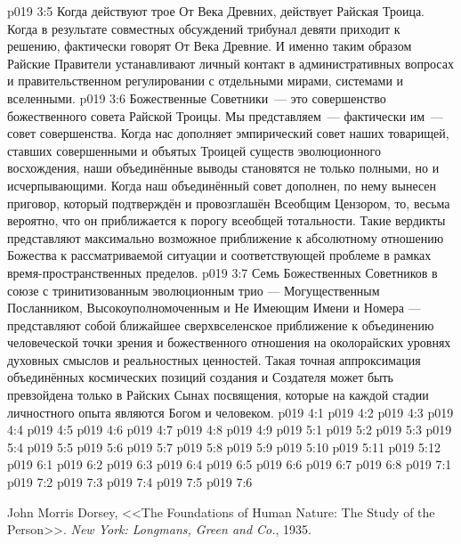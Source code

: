 \vs p019 3:5 Когда действуют трое От Века Древних, действует Райская Троица. Когда в результате совместных обсуждений трибунал девяти приходит к решению, фактически говорят От Века Древние. И именно таким образом Райские Правители устанавливают личный контакт в административных вопросах и правительственном регулировании с отдельными мирами, системами и вселенными.
\vs p019 3:6 \pc Божественные Советники~--- это совершенство божественного совета Райской Троицы. Мы представляем~--- фактически  им~--- совет совершенства. Когда нас дополняет эмпирический совет наших товарищей, ставших совершенными и объятых Троицей существ эволюционного восхождения, наши объединённые выводы становятся не только полными, но и исчерпывающими. Когда наш объединённый совет дополнен, по нему вынесен приговор, который подтверждён и провозглашён Всеобщим Цензором, то, весьма вероятно, что он приближается к порогу всеобщей тотальности. Такие вердикты представляют максимально возможное приближение к абсолютному отношению Божества к рассматриваемой ситуации и соответствующей проблеме в рамках время\hyp{}пространственных пределов.
\vs p019 3:7 Семь Божественных Советников в союзе с тринитизованным эволюционным трио --- Могущественным Посланником, Высокоуполномоченным и Не Имеющим Имени и Номера --- представляют собой ближайшее сверхвселенское приближение к объединению человеческой точки зрения и божественного отношения на околорайских уровнях духовных смыслов и реальностных ценностей. Такая точная аппроксимация объединённых космических позиций создания и Создателя может быть превзойдена только в Райских Сынах посвящения, которые на каждой стадии личностного опыта являются Богом и человеком.
\vs p019 4:1 
\vs p019 4:2 
\vs p019 4:3 
\vs p019 4:4 \pc 
\vs p019 4:5 \pc 
\vs p019 4:6 
\vs p019 4:7 
\vs p019 4:8 \pc 
\vs p019 4:9 
\vs p019 5:1 
\vs p019 5:2 
\vs p019 5:3 
\vs p019 5:4 
\vs p019 5:5 \pc 
\vs p019 5:6 
\vs p019 5:7 
\vs p019 5:8 \pc 
\vs p019 5:9 
\vs p019 5:10 
\vs p019 5:11 
\vs p019 5:12 
\vs p019 6:1 
\vs p019 6:2 
\vs p019 6:3 \pc 
\vs p019 6:4 \pc 
\vs p019 6:5 
\vs p019 6:6 
\vs p019 6:7 
\vs p019 6:8 
\vs p019 7:1 
\vs p019 7:2 \pc 
\vs p019 7:3 \pc 
\vs p019 7:4 
\vs p019 7:5 
\vsetoff
\vs p019 7:6 
\quizlink
\begin{thebibliography}{100}
John Morris Dorsey,
{<<The Foundations of Human Nature: The Study of the Person>>.}
{\em New York: Longmans, Green and Co.}, 1935.
\end{thebibliography}
